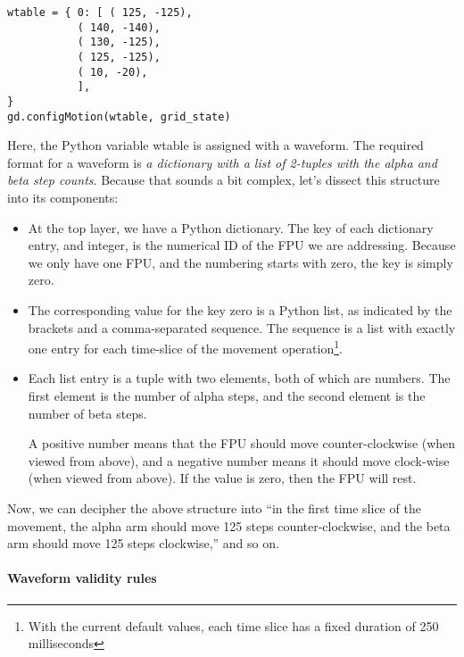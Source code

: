 \documentclass{scrartcl}[12pt,a4paper]
\begin{document}
\begin{verbatim}
wtable = { 0: [ ( 125, -125),
           ( 140, -140),
           ( 130, -125),
           ( 125, -125),
           ( 10, -20),
           ],
}
gd.configMotion(wtable, grid_state)
\end{verbatim}

Here, the Python variable wtable is assigned with
a waveform. The required format for a waveform
is \emph{a dictionary with a list of 2-tuples
  with the alpha and beta step counts}. Because
that sounds a bit complex, let's dissect this
structure into its components:

\begin{itemize}
  
\item At the top layer, we have a Python dictionary.  The key of each
  dictionary entry, and integer, is the numerical ID of the FPU we are
  addressing.  Because we only have one FPU, and the numbering starts
  with zero, the key is simply zero.

\item The corresponding value for the key zero is a Python list, as
  indicated by the brackets and a comma-separated sequence. The
  sequence is a list with exactly one entry for each time-slice of the
  movement operation\footnote{With the current default values,
  each time slice has a fixed duration of 250 milliseconds}.

\item Each list entry is a tuple with two elements, both of which are
  numbers. The first element is the number of alpha steps, and the
  second element is the number of beta steps.

  A positive number means that the FPU should move counter-clockwise
  (when viewed from above), and a negative number means it should move
  clock-wise (when viewed from above). If the value is zero, then the
  FPU will rest.

\end{itemize}

Now, we can decipher the above structure into ``in the first time
slice of the movement, the alpha arm should move 125 steps
counter-clockwise, and the beta arm should move 125 steps
clockwise,'' and so on.

\paragraph{Waveform validity rules}
\end{document}
